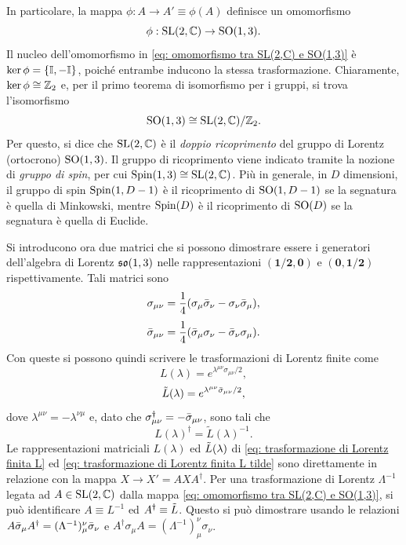 In particolare, la mappa $\phi : A \to A' \equiv \phi(A)$ definisce un omomorfismo 
\begin{equation}
    \phi : \mathrm{SL}(2,\mathbb{C}) \to \mathrm{SO}(1,3).
\end{equation}
Il nucleo dell'omomorfismo in \eqref{eq: omomorfismo tra SL(2,C) e SO(1,3)} è $\ker{\phi} = \{\mathbb{I}, -\mathbb{I}\}$, poiché entrambe inducono la stessa trasformazione. Chiaramente, $\ker{\phi} \cong \mathbb{Z}_2$ e, per il primo teorema di isomorfismo per i gruppi, si trova l'isomorfismo
\begin{equation}
    \mathrm{SO}(1,3) \cong \mathrm{SL}(2,\mathbb{C})/\mathbb{Z}_2.
\end{equation}
Per questo, si dice che $\mathrm{SL}(2,\mathbb{C})$ è il \emph{doppio ricoprimento} del gruppo di Lorentz (ortocrono) $\mathrm{SO}(1,3)$. Il gruppo di ricoprimento viene indicato tramite la nozione di \emph{gruppo di spin}, per cui $\mathrm{Spin}(1,3) \cong \mathrm{SL}(2,\mathbb{C})$. Più in generale, in $D$ dimensioni, il gruppo di spin $\mathrm{Spin}(1,D - 1)$ è il ricoprimento di $\mathrm{SO}(1,D - 1)$ se la segnatura è quella di Minkowski, mentre $\mathrm{Spin}(D)$ è il ricoprimento di $\mathrm{SO}(D)$ se la segnatura è quella di Euclide. 

Si introducono ora due matrici che si possono dimostrare essere i generatori dell'algebra di Lorentz $\mathfrak{so}(1,3)$ nelle rappresentazioni $\bm{(1/2,0)}$ e $\bm{(0,1/2)}$ rispettivamente. Tali matrici sono
\begin{equation}
    \sigma_{\mu\nu} = \dfrac{1}{4}(\sigma_\mu\bar{\sigma}_\nu - \sigma_\nu\bar{\sigma}_\mu),
\end{equation}
\begin{equation}
    \bar{\sigma}_{\mu\nu} = \dfrac{1}{4}(\bar{\sigma}_\mu\sigma_\nu - \bar{\sigma}_\nu\sigma_\mu).
\end{equation}
Con queste si possono quindi scrivere le trasformazioni di Lorentz finite come
\begin{equation}
\label{eq: trasformazione di Lorentz finita L}
    L(\lambda) = e^{\lambda^{\mu\nu}\sigma_{\mu\nu}/2},
\end{equation}
\begin{equation}
\label{eq: trasformazione di Lorentz finita L tilde}
    \tilde{L}(\lambda) = e^{\lambda^{\mu\nu}\bar{\sigma}_{\mu\nu}/2},
\end{equation}
dove $\lambda^{\mu\nu} = -\lambda^{\nu\mu}$ e, dato che $\sigma_{\mu\nu}^\dag = -\bar{\sigma}_{\mu\nu}$, sono tali che
\begin{equation}
    L(\lambda)^\dag = \tilde{L}(\lambda)^{-1}.
\end{equation}
Le rappresentazioni matriciali $L(\lambda)$ ed $\tilde{L}(\lambda)$ di \eqref{eq: trasformazione di Lorentz finita L} ed \eqref{eq: trasformazione di Lorentz finita L tilde} sono direttamente in relazione con la mappa $X \to X' = AXA^\dag$. Per una trasformazione di Lorentz $\Lambda^{-1}$ legata ad $A \in \mathrm{SL}(2,\mathbb{C})$ dalla mappa \eqref{eq: omomorfismo tra SL(2,C) e SO(1,3)}, si può identificare $A \equiv L^{-1}$ ed $A^\dag \equiv \tilde{L}$. Questo si può dimostrare usando le relazioni $A\bar{\sigma}_\mu A^\dag = (\Lambda^{-1})^\nu_\mu\bar{\sigma}_\nu$ e $A^\dag \sigma_\mu A = (\Lambda^{-1})^\nu_\mu\sigma_\nu$.

